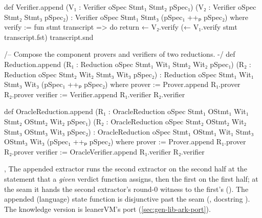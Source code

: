 \begin{leancode}
def Verifier.append (V₁ : Verifier oSpec Stmt₁ Stmt₂ pSpec₁)
    (V₂ : Verifier oSpec Stmt₂ Stmt₃ pSpec₂) :
      Verifier oSpec Stmt₁ Stmt₃ (pSpec₁ ++ₚ pSpec₂) where
  verify := fun stmt transcript => do
    return ← V₂.verify (← V₁.verify stmt transcript.fst) transcript.snd

/-- Compose the component provers and verifiers of two reductions. -/
def Reduction.append (R₁ : Reduction oSpec Stmt₁ Wit₁ Stmt₂ Wit₂ pSpec₁)
    (R₂ : Reduction oSpec Stmt₂ Wit₂ Stmt₃ Wit₃ pSpec₂) :
      Reduction oSpec Stmt₁ Wit₁ Stmt₃ Wit₃ (pSpec₁ ++ₚ pSpec₂) where
  prover := Prover.append R₁.prover R₂.prover
  verifier := Verifier.append R₁.verifier R₂.verifier
\end{leancode}



\begin{leancode}
def OracleReduction.append (R₁ : OracleReduction oSpec Stmt₁ OStmt₁ Wit₁ Stmt₂ OStmt₂ Wit₂ pSpec₁)
    (R₂ : OracleReduction oSpec Stmt₂ OStmt₂ Wit₂ Stmt₃ OStmt₃ Wit₃ pSpec₂) :
      OracleReduction oSpec Stmt₁ OStmt₁ Wit₁ Stmt₃ OStmt₃ Wit₃ (pSpec₁ ++ₚ pSpec₂) where
  prover := Prover.append R₁.prover R₂.prover
  verifier := OracleVerifier.append R₁.verifier R₂.verifier
\end{leancode}


\begin{define}{\allowbreak{}\allowbreak{}, \allowbreak{}\allowbreak{}}
The appended extractor runs the second extractor on the second half at the statement
 that a \emph{given} verdict function assigns, then the first on the first
half; at the seam it hands the second extractor's round-0 witness to the first's
 (\allowbreak{}). The appended (language) state
function is disjunctive past the seam (, docstring ). The knowledge
version is leanerVM's port (\cref{sec:gen-lib-ark-port}).
\end{define}

